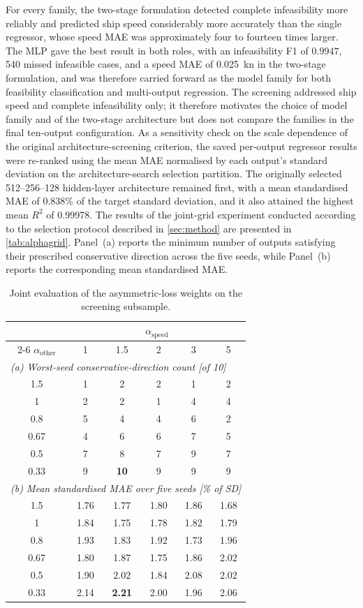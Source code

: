 \documentclass[final,5p,times,twocolumn,numbers]{elsarticle}
\begin{document}
For every family, the two-stage formulation detected complete infeasibility more reliably and predicted ship speed considerably more accurately than the single regressor, whose speed MAE was approximately four to fourteen times larger. The MLP gave the best result in both roles, with an infeasibility F1 of $0.9947$, 540 missed infeasible cases, and a speed MAE of 0.025~kn in the two-stage formulation, and was therefore carried forward as the model family for both feasibility classification and multi-output regression. The screening addressed ship speed and complete infeasibility only; it therefore motivates the choice of model family and of the two-stage architecture but does not compare the families in the final ten-output configuration.
As a sensitivity check on the scale dependence of the original architecture-screening criterion, the saved per-output regressor results were re-ranked using the mean MAE normalised by each output's standard deviation on the architecture-search selection partition. The originally selected 512--256--128 hidden-layer architecture remained first, with a mean standardised MAE of 0.838\% of the target standard deviation, and it also attained the highest mean $R^2$ of 0.99978. The results of the joint-grid experiment conducted according to the selection protocol described in \autoref{sec:method} are presented in \autoref{tab:alphagrid}. Panel~(a) reports the minimum number of outputs satisfying their prescribed conservative direction across the five seeds, while Panel~(b) reports the corresponding mean standardised MAE.
\begin{table}[ht]
\footnotesize
\centering
\caption{Joint evaluation of the asymmetric-loss weights on the screening subsample.}
\label{tab:alphagrid}
\begin{tabular}{cccccc}
\toprule
& \multicolumn{5}{c}{$\alpha_{\mathrm{speed}}$} \\
\cmidrule(lr){2-6}
$\alpha_{\mathrm{other}}$ & 1 & 1.5 & 2 & 3 & 5 \\
\midrule
\multicolumn{6}{l}{\emph{(a) Worst-seed conservative-direction count [of 10]}} \\
1.5 & 1 & 2 & 2 & 1 & 2 \\
1 & 2 & 2 & 1 & 4 & 4 \\
0.8 & 5 & 4 & 4 & 6 & 2 \\
0.67 & 4 & 6 & 6 & 7 & 5 \\
0.5 & 7 & 8 & 7 & 9 & 7 \\
0.33 & 9 & \textbf{10} & 9 & 9 & 9 \\
\midrule
\multicolumn{6}{l}{\emph{(b) Mean standardised MAE over five seeds [\% of SD]}} \\
1.5 & 1.76 & 1.77 & 1.80 & 1.86 & 1.68 \\
1 & 1.84 & 1.75 & 1.78 & 1.82 & 1.79 \\
0.8 & 1.93 & 1.83 & 1.92 & 1.73 & 1.96 \\
0.67 & 1.80 & 1.87 & 1.75 & 1.86 & 2.02 \\
0.5 & 1.90 & 2.02 & 1.84 & 2.08 & 2.02 \\
0.33 & 2.14 & \textbf{2.21} & 2.00 & 1.96 & 2.06 \\
\bottomrule
\end{tabular}
\end{table}
\end{document}
